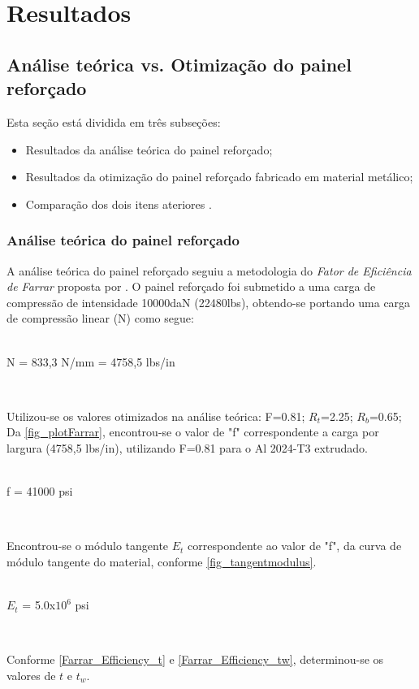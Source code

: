 \chapter[Resultados]{Resultados}

\section{Análise teórica vs. Otimização do painel reforçado}
Esta seção está dividida em três subseções:
\begin{itemize}
\item Resultados da análise teórica do painel reforçado;
\item Resultados da otimização do painel reforçado fabricado em material metálico;
\item Comparação dos dois itens ateriores .
\end{itemize}

\subsection{Análise teórica do painel reforçado}
A análise teórica do painel reforçado seguiu a metodologia do \emph{Fator de Eficiência de Farrar} proposta por \cite{niu1997airframe}. O painel reforçado foi submetido a uma carga de compressão de intensidade 10000daN (22480lbs), obtendo-se portando uma carga de compressão linear (N) como segue:\\~\\

\centerline{N = 833,3 N/mm = 4758,5 lbs/in}\


Utilizou-se os valores otimizados na análise teórica:
F=0.81; $R_t$=2.25; $R_b$=0.65;
Da \autoref{fig_plotFarrar}, encontrou-se o valor de "f" correspondente a carga por largura (4758,5 lbs/in), utilizando F=0.81 para o Al 2024-T3 extrudado.\\~\\


\centerline{f = 41000 psi}\

Encontrou-se o módulo tangente $E_t$ correspondente ao valor de "f", da curva de módulo tangente do material, conforme \autoref{fig_tangentmodulus}.\\~\\

\centerline{$E_t$ = 5.0x$10^6$ psi}
\

Conforme \autoref{Farrar_Efficiency_t} e \autoref{Farrar_Efficiency_tw}, determinou-se os valores de $t$ e $t_w$.\\~\\

